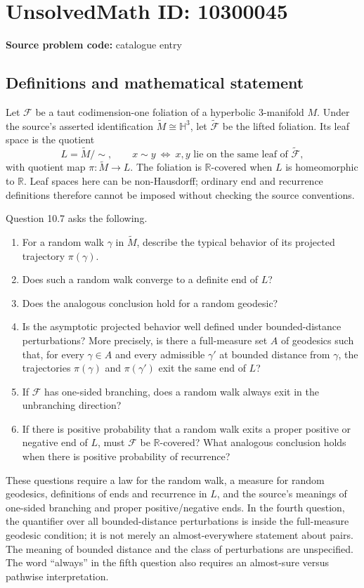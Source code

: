 \documentclass[11pt]{article}
\newcommand{\R}{\mathbb{R}}
\begin{document}
\section*{UnsolvedMath ID: 10300045}
\textbf{Source problem code:} catalogue entry
\subsection{Definitions and mathematical statement}
Let \(\mathcal F\) be a taut codimension-one foliation of a hyperbolic \(3\)-manifold \(M\). Under the source's asserted identification \(\widetilde M\cong\mathbb H^3\), let \(\widetilde{\mathcal F}\) be the lifted foliation. Its leaf space is the quotient
\[
 L=\widetilde M/{\sim},\qquad x\sim y\ \Longleftrightarrow\ x,y\text{ lie on the same leaf of }\widetilde{\mathcal F},
\]
with quotient map \(\pi:\widetilde M\to L\). The foliation is \(\R\)-covered when \(L\) is homeomorphic to \(\R\). Leaf spaces here can be non-Hausdorff; ordinary end and recurrence definitions therefore cannot be imposed without checking the source conventions.

Question 10.7 asks the following.
\begin{enumerate}
\item For a random walk \(\gamma\) in \(\widetilde M\), describe the typical behavior of its projected trajectory \(\pi(\gamma)\).
\item Does such a random walk converge to a definite end of \(L\)?
\item Does the analogous conclusion hold for a random geodesic?
\item Is the asymptotic projected behavior well defined under bounded-distance perturbations? More precisely, is there a full-measure set \(A\) of geodesics such that, for every \(\gamma\in A\) and every admissible \(\gamma'\) at bounded distance from \(\gamma\), the trajectories \(\pi(\gamma)\) and \(\pi(\gamma')\) exit the same end of \(L\)?
\item If \(\mathcal F\) has one-sided branching, does a random walk always exit in the unbranching direction?
\item If there is positive probability that a random walk exits a proper positive or negative end of \(L\), must \(\mathcal F\) be \(\R\)-covered? What analogous conclusion holds when there is positive probability of recurrence?
\end{enumerate}
These questions require a law for the random walk, a measure for random geodesics, definitions of ends and recurrence in \(L\), and the source's meanings of one-sided branching and proper positive/negative ends. In the fourth question, the quantifier over all bounded-distance perturbations is inside the full-measure geodesic condition; it is not merely an almost-everywhere statement about pairs. The meaning of bounded distance and the class of perturbations are unspecified. The word ``always'' in the fifth question also requires an almost-sure versus pathwise interpretation.
\end{document}
